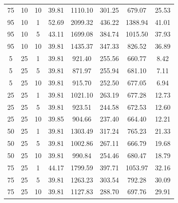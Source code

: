 \begin{table}[H]
\begin{tabular}{ccc|c|c|c|c|c}
75 & 10 & 10 & \cellcolor{gray!50}39.81 & \cellcolor{gray!1}1110.10 & \cellcolor{gray!1}301.25 & \cellcolor{gray!45}679.07 & 25.53\\
95 & 10 & 1 & \cellcolor{gray!1}52.69 & \cellcolor{gray!1}2099.32 & \cellcolor{gray!1}436.22 & \cellcolor{gray!1}1388.94 & 41.01\\
95 & 10 & 5 & \cellcolor{gray!17}43.11 & \cellcolor{gray!1}1699.08 & \cellcolor{gray!1}384.74 & \cellcolor{gray!1}1015.50 & 37.93\\
95 & 10 & 10 & \cellcolor{gray!50}39.81 & \cellcolor{gray!1}1435.37 & \cellcolor{gray!1}347.33 & \cellcolor{gray!1}826.52 & 36.89\\
5 & 25 & 1 & \cellcolor{gray!50}39.81 & \cellcolor{gray!18}921.40 & \cellcolor{gray!1}255.56 & \cellcolor{gray!50}660.77 & 8.42\\
5 & 25 & 5 & \cellcolor{gray!50}39.81 & \cellcolor{gray!26}871.97 & \cellcolor{gray!1}255.94 & \cellcolor{gray!44}681.10 & 7.11\\
5 & 25 & 10 & \cellcolor{gray!50}39.81 & \cellcolor{gray!19}915.70 & \cellcolor{gray!1}252.50 & \cellcolor{gray!45}677.05 & 6.94\\
25 & 25 & 1 & \cellcolor{gray!50}39.81 & \cellcolor{gray!1}1021.10 & \cellcolor{gray!1}263.19 & \cellcolor{gray!45}677.28 & 12.73\\
25 & 25 & 5 & \cellcolor{gray!50}39.81 & \cellcolor{gray!18}923.51 & \cellcolor{gray!1}244.58 & \cellcolor{gray!47}672.53 & 12.60\\
25 & 25 & 10 & \cellcolor{gray!50}39.85 & \cellcolor{gray!21}904.66 & \cellcolor{gray!1}237.40 & \cellcolor{gray!49}664.40 & 12.21\\
50 & 25 & 1 & \cellcolor{gray!50}39.81 & \cellcolor{gray!1}1303.49 & \cellcolor{gray!1}317.24 & \cellcolor{gray!18}765.23 & 21.33\\
50 & 25 & 5 & \cellcolor{gray!50}39.81 & \cellcolor{gray!4}1002.86 & \cellcolor{gray!1}267.11 & \cellcolor{gray!48}666.79 & 19.68\\
50 & 25 & 10 & \cellcolor{gray!50}39.81 & \cellcolor{gray!6}990.84 & \cellcolor{gray!1}254.46 & \cellcolor{gray!44}680.47 & 18.79\\
75 & 25 & 1 & \cellcolor{gray!6}44.17 & \cellcolor{gray!1}1799.59 & \cellcolor{gray!1}397.71 & \cellcolor{gray!1}1053.97 & 32.16\\
75 & 25 & 5 & \cellcolor{gray!50}39.81 & \cellcolor{gray!1}1263.23 & \cellcolor{gray!1}303.54 & \cellcolor{gray!10}792.28 & 30.09\\
75 & 25 & 10 & \cellcolor{gray!50}39.81 & \cellcolor{gray!1}1127.83 & \cellcolor{gray!1}288.70 & \cellcolor{gray!39}697.76 & 29.91\\

\end{tabular}
\end{table}
